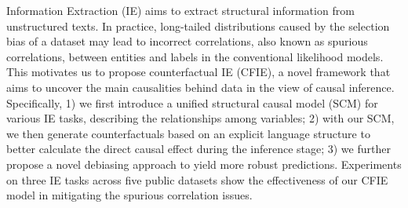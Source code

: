 Information Extraction (IE) aims to extract structural information from unstructured texts. In practice, long-tailed distributions caused by the selection bias of a dataset may lead to incorrect correlations,  also known as spurious correlations, between entities and labels in the conventional likelihood models. This motivates us to propose counterfactual IE (CFIE), a novel framework that aims to uncover the main causalities behind data in the view of causal inference. Specifically, 1) we first introduce a unified structural causal model (SCM) for various IE tasks, describing the relationships among variables; 2) with our SCM, we then generate counterfactuals based on an explicit language structure to better calculate the direct causal effect during the inference stage; 3) we further propose a novel debiasing approach to yield more robust predictions. Experiments on three IE tasks across five public datasets show the effectiveness of our CFIE model in mitigating the spurious correlation issues.
